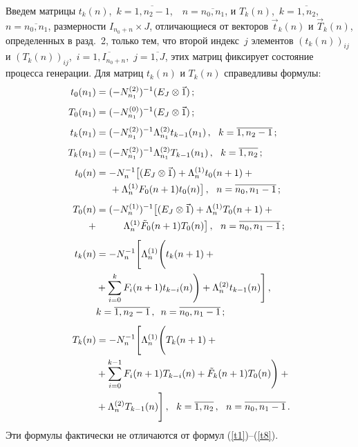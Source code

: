 \begin{multicols}{2}
Введем матрицы $t_k(n)$,\  $k=\overline{1,n_2-1}$,\ \
$n=\overline{n_0,n_1}$, и $T_k(n)$,\  $k=\overline{1,n_2}$,\ 
$n=\overline{n_0,n_1}$, размерности $I_{n_0+n} \times J$,
отличающиеся от векторов $\vec t_k(n)$ и $\vec T_k(n)$,
определенных в разд.~2, только тем, что второй
индекс~$j$ элементов $(t_k(n))_{ij}$ и $(T_k(n))_{ij}$,\
$i=\overline{1,I_{n_0+n}}$,\ $j=\overline{1,J}$,
этих матриц фиксирует состояние процесса генерации.
Для матриц $t_k(n)$ и $T_k(n)$ справедливы формулы:
\begin{align*}
t_0(n_1) &= (-N^{(2)}_{n_1})^{-1} (E_J\otimes \vec 1)\,;
\\[4pt]
T_0(n_1) & = (-N^{(0)}_{n_1})^{-1} (E_J\otimes \vec 1)\,;
\\[4pt]
t_k(n_1) & =
(-N^{(2)}_{n_1})^{-1} \Lambda^{(2)}_{n_1}
t_{k-1}(n_1)\,,
\ \ k=\overline{1,n_2-1}\,;
\\[4pt]
T_k(n_1) & =
(-N^{(2)}_{n_1})^{-1} \Lambda^{(2)}_{n_1}
T_{k-1}(n_1)\,,
\ \ k=\overline{1,n_2}\,;
\\[4pt]
t_0(n) & = -N_{n}^{-1}
\big[
(E_J\otimes \vec1) +
\Lambda^{(1)}_{n} t_0(n+1) +{}\\
&\hspace*{5mm}{}+
\Lambda^{(1)}_{n} F_0(n+1) t_0(n)
\big]\,,
\ \ n=\overline{n_0,n_1-1}\,;
\\[4pt]
T_0(n) & =
(-N^{(1)}_{n})^{-1}
\big[
(E_J \otimes \vec 1) +
\Lambda^{(1)}_{n}
T_0(n+1) +{}\\
{}+
&\hspace*{10mm}\Lambda^{(1)}_{n} \tilde F_0(n+1) T_0(n)
\big]\,,
\ \ n=\overline{n_0,n_1-1}\,;
\\[4pt]
t_k(n) & =
-N_{n}^{-1}
\Bigg[
\Lambda^{(1)}_{n}
\Bigg(
t_k(n+1)
+{}\\
&{}+
\sum\limits_{i=0}^{k}
F_i(n+1) t_{k-i}(n)
\Bigg)
+
\Lambda^{(2)}_{n} t_{k-1}(n)
\Bigg]\,,\\
& k=\overline{1,n_2-1}\,,
\enskip n=\overline{n_0,n_1-1}\,;
\\[4pt]
T_k(n) & =
-N_{n}^{-1}
\Bigg[
\Lambda^{(1)}_{n}
\Bigg(
T_k(n+1)
+{}\\
&{}+
\sum\limits_{i=0}^{k-1}
F_i(n+1) T_{k-i}(n)
+
\tilde F_k(n+1) T_0(n)
\Bigg)
+{}\\
&{}+
\Lambda^{(2)}_{n} T_{k-1}(n)
\Bigg]\,,
\ \ k=\overline{1,n_2}\,,
\ \ n=\overline{n_0,n_1-1}\,.
\end{align*}
Эти формулы фактически не отличаются от формул (\ref{t1})--(\ref{t8}).


\end{multicols}
